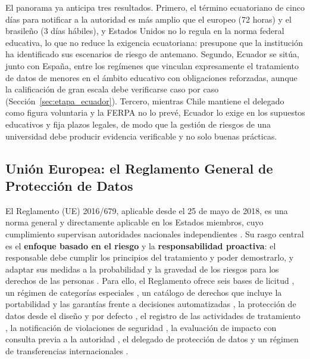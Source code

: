 El panorama ya anticipa tres resultados. Primero, el término ecuatoriano de cinco días para notificar a la autoridad es más amplio que el europeo (72 horas) y el brasileño (3 días hábiles), y Estados Unidos no lo regula en la norma federal educativa, lo que no reduce la exigencia ecuatoriana: presupone que la institución ha identificado sus escenarios de riesgo de antemano. Segundo, Ecuador se sitúa, junto con España, entre los regímenes que vinculan expresamente el tratamiento de datos de menores en el ámbito educativo con obligaciones reforzadas, aunque la calificación de gran escala debe verificarse caso por caso (Sección~\ref{sec:etapa_ecuador}). Tercero, mientras Chile mantiene el delegado como figura voluntaria y la FERPA no lo prevé, Ecuador lo exige en los supuestos educativos y fija plazos legales, de modo que la gestión de riesgos de una universidad debe producir evidencia verificable y no solo buenas prácticas.

\subsection{Unión Europea: el Reglamento General de Protección de Datos}
\label{sec:marco_rgpd}

El Reglamento (UE) 2016/679, aplicable desde el 25 de mayo de 2018, es una norma general y directamente aplicable en los Estados miembros, cuyo cumplimiento supervisan autoridades nacionales independientes \cite{rgpd2016}. Su rasgo central es el \textbf{enfoque basado en el riesgo} y la \textbf{responsabilidad proactiva}: el responsable debe cumplir los principios del tratamiento y poder demostrarlo, y adaptar sus medidas a la probabilidad y la gravedad de los riesgos para los derechos de las personas \cite[arts.~5 y 24]{rgpd2016}. Para ello, el Reglamento ofrece seis bases de licitud \cite[art.~6]{rgpd2016}, un régimen de categorías especiales \cite[art.~9]{rgpd2016}, un catálogo de derechos que incluye la portabilidad y las garantías frente a decisiones automatizadas \cite[arts.~15 a 22]{rgpd2016}, la protección de datos desde el diseño y por defecto \cite[art.~25]{rgpd2016}, el registro de las actividades de tratamiento \cite[art.~30]{rgpd2016}, la notificación de violaciones de seguridad \cite[arts.~33 y 34]{rgpd2016}, la evaluación de impacto con consulta previa a la autoridad \cite[arts.~35 y 36]{rgpd2016}, el delegado de protección de datos \cite[arts.~37 a 39]{rgpd2016} y un régimen de transferencias internacionales \cite[arts.~44 a 49]{rgpd2016}.

